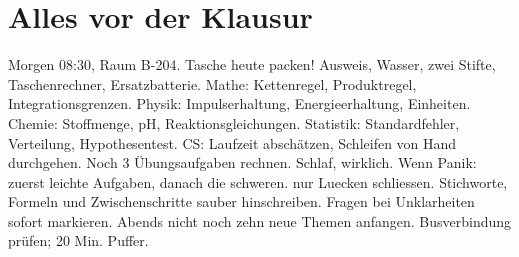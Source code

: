 \documentclass{article}
\begin{document}
\section{Alles vor der Klausur}
Morgen 08:30, Raum B-204. Tasche heute packen!\newline
Ausweis, Wasser, zwei Stifte, Taschenrechner, Ersatzbatterie.\newline
{}
Mathe: Kettenregel, Produktregel, Integrationsgrenzen.\newline
Physik: Impulserhaltung, Energieerhaltung, Einheiten.\newline
Chemie: Stoffmenge, pH, Reaktionsgleichungen.\newline
Statistik: Standardfehler, Verteilung, Hypothesentest.\newline
CS: Laufzeit abschätzen, Schleifen von Hand durchgehen.\newline
Noch  3 Übungsaufgaben rechnen.\newline
{} Schlaf, wirklich.\newline
Wenn Panik: zuerst leichte Aufgaben, danach die schweren.\newline
{} nur Luecken schliessen.\newline
Stichworte, Formeln und Zwischenschritte sauber hinschreiben.\newline
Fragen bei Unklarheiten sofort markieren.\newline
Abends nicht noch zehn neue Themen anfangen.\newline
Busverbindung prüfen; 20 Min. Puffer.
\end{document}
